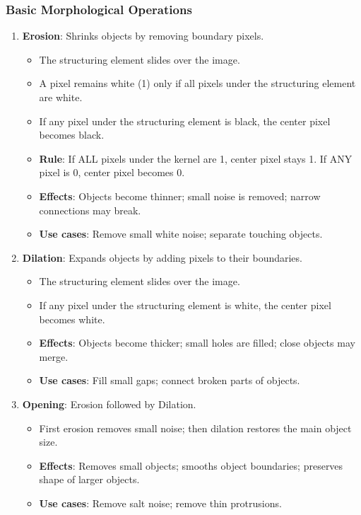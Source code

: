 \documentclass[11pt,a4paper]{article}
\begin{document}
\subsubsection{Basic Morphological Operations}

\begin{enumerate}
    \item \textbf{Erosion}: Shrinks objects by removing boundary pixels.
    \begin{itemize}
        \item The structuring element slides over the image.
        \item A pixel remains white (1) only if all pixels under the structuring element are white.
        \item If any pixel under the structuring element is black, the center pixel becomes black.
        \item \textbf{Rule}: If ALL pixels under the kernel are 1, center pixel stays 1. If ANY pixel is 0, center pixel becomes 0.
        \item \textbf{Effects}: Objects become thinner; small noise is removed; narrow connections may break.
        \item \textbf{Use cases}: Remove small white noise; separate touching objects.
    \end{itemize}

    \item \textbf{Dilation}: Expands objects by adding pixels to their boundaries.
    \begin{itemize}
        \item The structuring element slides over the image.
        \item If any pixel under the structuring element is white, the center pixel becomes white.
        \item \textbf{Effects}: Objects become thicker; small holes are filled; close objects may merge.
        \item \textbf{Use cases}: Fill small gaps; connect broken parts of objects.
    \end{itemize}

    \item \textbf{Opening}: Erosion followed by Dilation.
    \begin{itemize}
        \item First erosion removes small noise; then dilation restores the main object size.
        \item \textbf{Effects}: Removes small objects; smooths object boundaries; preserves shape of larger objects.
        \item \textbf{Use cases}: Remove salt noise; remove thin protrusions.
    \end{itemize}


\end{enumerate}
\end{document}
